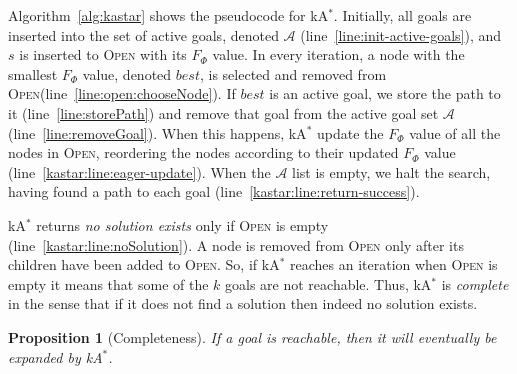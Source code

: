 \documentclass[twoside,11pt]{article}
\newtheorem{proposition}[theorem]{Proposition}
\newcommand{\astar}{A$^*$\xspace}
\newcommand{\kastar}{kA$^*$\xspace}
\newcommand{\open}{\textsc{Open}\xspace}
\newcommand{\activeg}{\mathcal{A}}
\newcommand{\vect}[1]{\mathbf{#1}}
\begin{document}
Algorithm~\ref{alg:kastar} shows the pseudocode for \kastar. 
Initially, all goals are inserted into the set of active goals, denoted  $\activeg$ (line~\ref{line:init-active-goals}), and $s$ is inserted to \open with its $F_\Phi$ value. 
In every iteration, a node with the smallest $F_\Phi$ value, denoted $\mathit{best}$, is selected and removed from \open (line~\ref{line:open:chooseNode}).
If $\mathit{best}$ is an active goal, we store the path to it (line~\ref{line:storePath}) and remove that goal from the active goal set $\activeg$ (line~\ref{line:removeGoal}). 
When this happens, \kastar update the $F_\Phi$ value of all the nodes in \open, reordering the nodes according to their updated $F_\Phi$ value 
 (line~\ref{kastar:line:eager-update}).
When the $\activeg$ list is empty, we halt the search, having found a path to each goal (line~\ref{kastar:line:return-success}).


\kastar returns \emph{no solution exists} only if \open is empty (line~\ref{kastar:line:noSolution}).
A node is removed from \open only after its children have been added to \open. 
So, if \kastar reaches an iteration when \open is empty it means that some of the $k$ goals are not reachable.
Thus, \kastar is \emph{complete} in the sense that if it does not find a solution then indeed no solution exists.

\begin{proposition}[Completeness]
  \label{prop:completeness}
  If a goal is reachable, then it will eventually be expanded by \kastar. 
\end{proposition}
\end{document}
